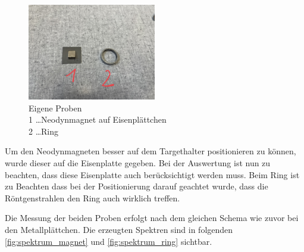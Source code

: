 \documentclass[12pt,english,ngerman]{scrartcl}
\begin{document}
\begin{figure}[H]
	\begin{center}
		\includegraphics[width =0.5\textwidth]{./figures/eigene_proben.jpg}
	\end{center}
	\caption[Eigene Proben]
	{Eigene Proben\\
	1 \dots Neodynmagnet auf Eisenplättchen\\
	2 \dots Ring
	}\label{fig:unbekannte_pr}
\end{figure}

Um den Neodynmagneten besser auf dem Targethalter positionieren zu können, wurde dieser auf die Eisenplatte gegeben. Bei der
Auswertung ist nun zu beachten, dass diese Eisenplatte auch berücksichtigt werden muss.
Beim Ring ist zu Beachten dass bei der Positionierung darauf geachtet wurde, dass die Röntgenstrahlen den Ring auch 
wirklich treffen.

Die Messung der beiden Proben erfolgt nach dem gleichen Schema wie zuvor bei den Metallplättchen.
Die erzeugten Spektren sind in folgenden \autoref{fig:spektrum_magnet} und \autoref{fig:spektrum_ring} sichtbar.
\end{document}
